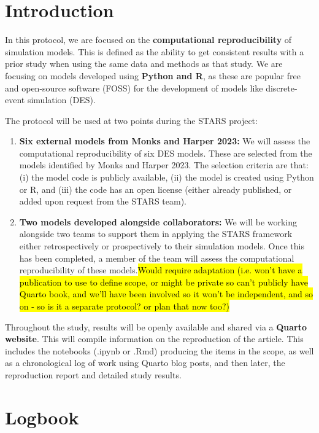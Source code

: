 \section{Introduction}

In this protocol, we are focused on the \textbf{computational reproducibility} of simulation models. This is defined as the ability to get consistent results with a prior study when using  the same data and methods as that study. We are focusing on models developed using \textbf{Python and R}, as these are popular free and open-source software (FOSS) for the development of models like discrete-event simulation (DES).\autocite{monks_computer_2023}

The protocol will be used at two points during the STARS project:

\begin{enumerate}
    \item \textbf{Six external models from Monks and Harper 2023:} We will assess the computational reproducibility of six DES models. These are selected from the models identified by Monks and Harper 2023.\autocite{monks_computer_2023} The selection criteria are that: (i) the model code is publicly available, (ii) the model is created using Python or R, and (iii) the code has an open license (either already published, or added upon request from the STARS team).
    \item \textbf{Two models developed alongside collaborators:} We will be working alongside two teams to support them in applying the STARS framework either retrospectively or prospectively to their simulation models. Once this has been completed, a member of the team will assess the computational reproducibility of these models.\hl{Would require adaptation (i.e. won't have a publication to use to define scope, or might be private so can't publicly have Quarto book, and we'll have been involved so it won't be independent, and so on - so is it a separate protocol? or plan that now too?)}
\end{enumerate}

Throughout the study, results will be openly available and shared via a \textbf{Quarto website}. This will compile information on the reproduction of the article. This includes the notebooks (.ipynb or .Rmd) producing the items in the scope, as well as a chronological log of work using Quarto blog posts, and then later, the reproduction report and detailed study results.

\vspace{1cm}
\section{Logbook}

